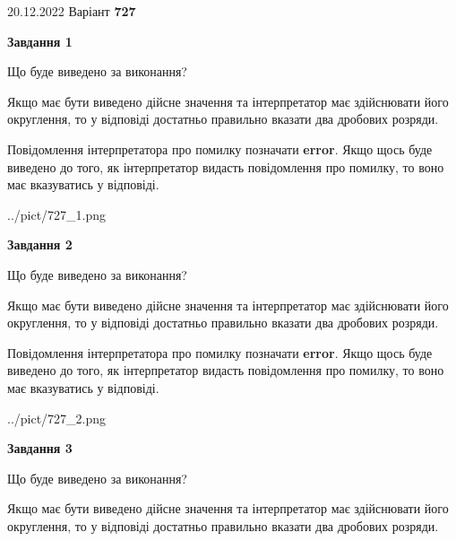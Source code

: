\documentclass[12pt, ukrainian]{article}
\begin{document}
{20.12.2022 Варіант \No \textbf { 727 }\par}
{
\begin {Large}

{\begin {center}\textbf{Завдання 1}\end {center}}\par
Що буде виведено за виконання? \par

Якщо має бути виведено дійсне значення та інтерпретатор має здійснювати його округлення, 
то у відповіді достатньо правильно вказати два дробових розряди.

Повідомлення інтерпретатора про помилку позначати \textbf{error}.
Якщо щось буде виведено до того, як інтерпретатор видасть повідомлення про помилку, 
то воно має вказуватись у відповіді. \par

\begin{center}
	{../pict/727_1.png}
\end{center}
\newpage

{\begin {center}\textbf{Завдання 2}\end {center}}\par
Що буде виведено за виконання? \par

Якщо має бути виведено дійсне значення та інтерпретатор має здійснювати його округлення, 
то у відповіді достатньо правильно вказати два дробових розряди.

Повідомлення інтерпретатора про помилку позначати \textbf{error}.
Якщо щось буде виведено до того, як інтерпретатор видасть повідомлення про помилку, 
то воно має вказуватись у відповіді. \par

\begin{center}
	{../pict/727_2.png}
\end{center}
\newpage

{\begin {center}\textbf{Завдання 3}\end {center}}\par
Що буде виведено за виконання? \par

Якщо має бути виведено дійсне значення та інтерпретатор має здійснювати його округлення, 
то у відповіді достатньо правильно вказати два дробових розряди.


\end{Large}}
\end{document}
